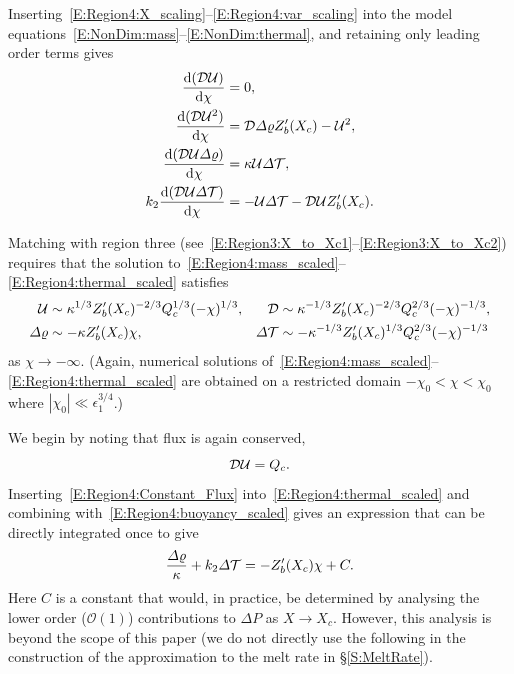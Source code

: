 \documentclass[openacc]{rsproca_new}%
\newcommand{\dd}[2]{\frac{\mathrm{d} #1}{\mathrm{d} #2}}
\newcommand{\order}[1]{\mathcal{O}(#1)}
\newcommand{\epsone}{\epsilon_{1}} %
\begin{document}
Inserting~\eqref{E:Region4:X_scaling}--\eqref{E:Region4:var_scaling} into the model equations~\eqref{E:NonDim:mass}--\eqref{E:NonDim:thermal}, and retaining only leading order terms gives
\begin{align}
\dd{(\D\U)}{\chi} &=0,\label{E:Region4:mass_scaled}\\
\dd{(\D \U^2)}{\chi} &=  \D \p Z_b'(X_c) -\U^2,\label{E:Region4:mom_scaled}\\
\dd{(\D\U\p)}{\chi} &=\kappa  \U\t,\label{E:Region4:buoyancy_scaled}\\
k_2 \dd{(\D \U \t)}{\chi} &=- \U \t - \D \U Z_b'(X_c).\label{E:Region4:thermal_scaled}
\end{align}

Matching with region three (see~\eqref{E:Region3:X_to_Xc1}--\eqref{E:Region3:X_to_Xc2}) requires that the solution to~\eqref{E:Region4:mass_scaled}--\eqref{E:Region4:thermal_scaled} satisfies
\begin{align}
\mathcal{U} &\sim \kappa^{1/3}Z_b'(X_c)^{-2/3}Q_c^{1/3} (-\chi)^{1/3}, &  \mathcal{D} &\sim \kappa^{-1/3} Z_b'(X_c)^{-2/3} Q_c^{2/3}(-\chi)^{-1/3}\label{E:Region4:far_field1},\\
\varDelta \varrho &\sim - \kappa Z_b'(X_c) \chi, & \varDelta \mathcal{T} &\sim -\kappa^{-1/3} Z_b'(X_c)^{1/3} Q_c^{2/3}(-\chi)^{-1/3}\label{E:Region4:far_field2}
\end{align}
as $\chi \to -\infty$. (Again, numerical solutions of~\eqref{E:Region4:mass_scaled}--\eqref{E:Region4:thermal_scaled} are obtained on a restricted domain $-\chi_0 < \chi < \chi_0$ where $|\chi_0| \ll \epsone^{3/4}$.)

We begin by noting that flux is again conserved,
\begin{equation}\label{E:Region4:Constant_Flux}
\mathcal{D}\mathcal{U}  = Q_c.
\end{equation}
Inserting~\eqref{E:Region4:Constant_Flux} into~\eqref{E:Region4:thermal_scaled} and combining with~\eqref{E:Region4:buoyancy_scaled} gives an expression that can be directly integrated once to give
\begin{equation}\label{E:Region4:Linear_p_t}
\frac{\varDelta \varrho}{\kappa} + k_2 \varDelta \mathcal{T} = -Z_b'(X_c)\chi + C.
\end{equation}
Here $C$ is a constant that would, in practice, be determined by analysing the lower order ($\order{1}$) contributions to $\Delta P$ as $X \to X_c$. However, this analysis is beyond the scope of this paper (we do not directly use the following in the construction of the approximation to the melt rate in \S\ref{S:MeltRate}).
\end{document}
